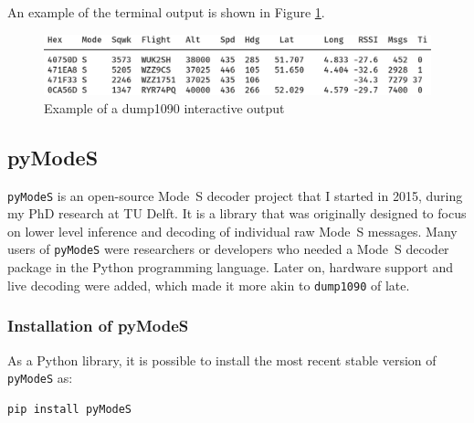 An example of the terminal output is shown in Figure \ref{fig:dump1090}.

\begin{figure}[ht]
  \centering
  \includegraphics[scale=0.33]{figures/quickstart/dump1090.png}
  \caption{Example of a dump1090 interactive output}
  \label{fig:dump1090}
\end{figure}



  


\subsection{pyModeS}
\texttt{pyModeS} is an open-source Mode~S decoder project that I started in 2015, during my PhD research at TU Delft. It is a library that was originally designed to focus on lower level inference and decoding of individual raw Mode~S messages. Many users of \texttt{pyModeS} were researchers or developers who needed a Mode~S decoder package in the Python programming language. Later on, hardware support and live decoding were added, which made it more akin to \texttt{dump1090} of late.


\subsubsection{Installation of pyModeS}

As a Python library, it is possible to install the most recent stable version of \texttt{pyModeS} as:

\begin{verbatim}
pip install pyModeS
\end{verbatim}


